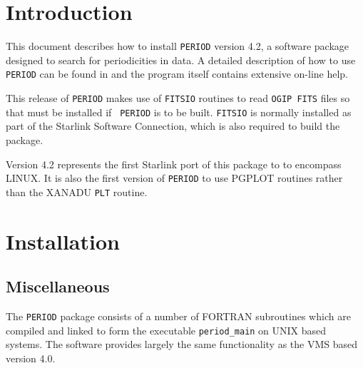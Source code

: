  \begin{latexonly}
   \setlength{\parskip}{0mm}
   \latexonlytoc
   \setlength{\parskip}{\medskipamount}
   \markright{\stardocname}
 \end{latexonly}
\newpage
\renewcommand{\thepage}{\arabic{page}}

\section{Introduction}

This document describes how to install {\tt PERIOD} version 4.2, a
software package designed to search for periodicities in data.  A
detailed description of how to use {\tt PERIOD} can be found in
 and the program itself contains extensive
on-line help.

This release of {\tt PERIOD} makes use of {\tt FITSIO} routines
to read {\tt OGIP FITS} files so that must be installed if {\tt
PERIOD} is to be built.  {\tt FITSIO} is normally installed as part of
the Starlink Software Connection, which is also required to build the
package.

Version 4.2 represents the first Starlink port of this package to
to encompass LINUX. It is also  the first version of {\tt PERIOD} to use
PGPLOT routines rather than the XANADU {\tt PLT} routine.

\section{Installation}

\subsection{Miscellaneous}

The {\tt PERIOD} package consists of a number of FORTRAN subroutines
which are compiled and linked to form the executable {\tt period\_main}
on UNIX based systems.  The software provides largely the same functionality as
the VMS based version 4.0.

